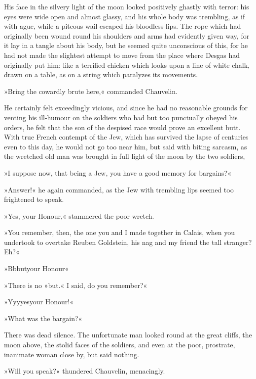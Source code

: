 His face in the silvery light of the moon looked positively ghastly with terror: his eyes were wide open and almost glassy, and his whole body was trembling, as if with ague, while a piteous wail escaped his bloodless lips. The rope which had originally been wound round his shoulders and arms had evidently given way, for it lay in a tangle about his body, but he seemed quite unconscious of this, for he had not made the slightest attempt to move from the place where Desgas had originally put him: like a terrified chicken which looks upon a line of white chalk, drawn on a table, as on a string which paralyzes its movements.

»Bring the cowardly brute here,« commanded Chauvelin.

He certainly felt exceedingly vicious, and since he had no reasonable grounds for venting his ill-humour on the soldiers who had but too punctually obeyed his orders, he felt that the son of the despised race would prove an excellent butt. With true French contempt of the Jew, which has survived the lapse of centuries even to this day, he would not go too near him, but said with biting sarcasm, as the wretched old man was brought in full light of the moon by the two soldiers,\longdash


»I suppose now, that being a Jew, you have a good memory for bargains?«

»Answer!« he again commanded, as the Jew with trembling lips seemed too frightened to speak.

»Yes, your Honour,« stammered the poor wretch.

»You remember, then, the one you and I made together in Calais, when you undertook to overtake Reuben Goldstein, his nag and my friend the tall stranger? Eh?«

»B\textellipsis \allowbreak  b\textellipsis \allowbreak  but\textellipsis \allowbreak  your Honour\textellipsis«

»There is no »but.« I said, do you remember?«

»Y\textellipsis \allowbreak  y\textellipsis \allowbreak  y\textellipsis \allowbreak  yes\textellipsis \allowbreak  your Honour!«

»What was the bargain?«

There was dead silence. The unfortunate man looked round at the great cliffs, the moon above, the stolid faces of the soldiers, and even at the poor, prostrate, inanimate woman close by, but said nothing.

»Will you speak?« thundered Chauvelin, menacingly.

